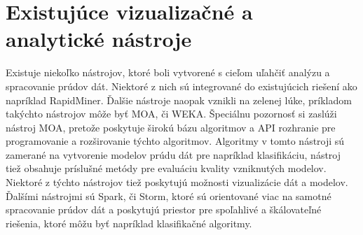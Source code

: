\chapter{Existujúce vizualizačné a analytické nástroje}
\label{Existujúce vizualizačné a analytické nástroje}
Existuje niekoľko nástrojov, ktoré boli vytvorené s cieľom uľahčiť analýzu a spracovanie prúdov dát. Niektoré z nich sú integrované do existujúcich riešení ako napríklad RapidMiner. Ďalšie nástroje naopak vznikli na zelenej lúke, príkladom takýchto nástrojov môže byť MOA, či WEKA. Špeciálnu pozornosť si zaslúži nástroj MOA, pretože poskytuje širokú bázu algoritmov a API rozhranie pre programovanie a rozširovanie týchto algoritmov. Algoritmy v tomto nástroji sú zamerané na vytvorenie modelov prúdu dát pre napríklad klasifikáciu, nástroj tiež obsahuje príslušné metódy pre evaluáciu kvality vzniknutých modelov. Niektoré z týchto nástrojov tiež poskytujú možnosti vizualizácie dát a modelov. Ďalšími nástrojmi sú Spark, či Storm, ktoré sú orientované viac na samotné spracovanie prúdov dát a poskytujú priestor pre spoľahlivé a škálovateľné riešenia, ktoré môžu byť napríklad klasifikačné algoritmy.

